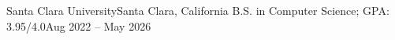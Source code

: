 \resumeSubHeadingListStart
  \resumeSubheading
    {Santa Clara University}{Santa Clara, California}
    {B.S. in Computer Science; GPA: 3.95/4.0}{Aug 2022 -- May 2026}
\resumeSubHeadingListEnd
